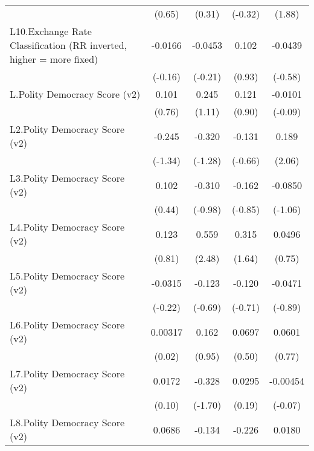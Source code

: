 {\begin{longtable}{l*{4}{c}}
                &   (0.65)         &   (0.31)         &  (-0.32)         &   (1.88)         \\
[1em]
L10.Exchange Rate Classification (RR inverted, higher = more fixed)&  -0.0166         &  -0.0453         &    0.102         &  -0.0439         \\
                &  (-0.16)         &  (-0.21)         &   (0.93)         &  (-0.58)         \\
[1em]
L.Polity Democracy Score (v2)&    0.101         &    0.245         &    0.121         &  -0.0101         \\
                &   (0.76)         &   (1.11)         &   (0.90)         &  (-0.09)         \\
[1em]
L2.Polity Democracy Score (v2)&   -0.245         &   -0.320         &   -0.131         &    0.189\sym{*}  \\
                &  (-1.34)         &  (-1.28)         &  (-0.66)         &   (2.06)         \\
[1em]
L3.Polity Democracy Score (v2)&    0.102         &   -0.310         &   -0.162         &  -0.0850         \\
                &   (0.44)         &  (-0.98)         &  (-0.85)         &  (-1.06)         \\
[1em]
L4.Polity Democracy Score (v2)&    0.123         &    0.559\sym{*}  &    0.315         &   0.0496         \\
                &   (0.81)         &   (2.48)         &   (1.64)         &   (0.75)         \\
[1em]
L5.Polity Democracy Score (v2)&  -0.0315         &   -0.123         &   -0.120         &  -0.0471         \\
                &  (-0.22)         &  (-0.69)         &  (-0.71)         &  (-0.89)         \\
[1em]
L6.Polity Democracy Score (v2)&  0.00317         &    0.162         &   0.0697         &   0.0601         \\
                &   (0.02)         &   (0.95)         &   (0.50)         &   (0.77)         \\
[1em]
L7.Polity Democracy Score (v2)&   0.0172         &   -0.328         &   0.0295         & -0.00454         \\
                &   (0.10)         &  (-1.70)         &   (0.19)         &  (-0.07)         \\
[1em]
L8.Polity Democracy Score (v2)&   0.0686         &   -0.134         &   -0.226         &   0.0180         \\

\end{longtable}}
